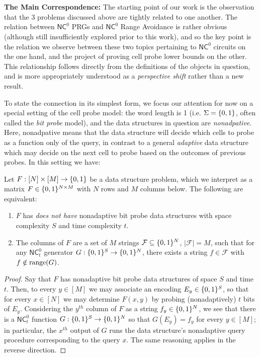 ~\\~\\
{\bf \noindent The Main Correspondence:}
The starting point of our work is the observation that the 3 problems discussed above are tightly related to one another. The relation between $\mathsf{NC}^0$ PRGs and $\mathsf{NC}^0$ Range Avoidance is rather obvious (although still insufficiently explored prior to this work), and so the key point is the relation we observe between these two topics pertaining to $\mathsf{NC}^0$ circuits on the one hand, and the project of proving cell probe lower bounds on the other. This relationship follows directly from the definitions of the objects in question, and is more appropriately understood as a \emph{perspective shift} rather than a new result. 

To state the connection in its simplest form, we focus our attention for now on a special setting of the cell probe model: the word length is 1 (i.e. $\Sigma = \{0,1\}$, often called the \emph{bit probe} model), and the data structures in question are \emph{nonadpative}. Here, nonadpative means that the data structure will decide which cells to probe as a function only of the query, in contrast to a general \emph{adaptive} data structure which may decide on the next cell to probe based on the outcomes of previous probes. In this setting we have:
\begin{observation*}
Let $F: [N] \times [M] \to \{0,1\}$ be a data structure problem, which we interpret as a matrix $F \in \{0,1\}^{N \times M}$ with $N$ rows and $M$ columns below. The following are equivalent:
\begin{enumerate}
    \item $F$ has \emph{does not have} nonadaptive bit probe data structures with space complexity $S$ and time complexity $t$.
    \item The columns of $F$ are a set of $M$ strings $\mathcal{F} \subseteq \{0,1\}^N$, $|\mathcal{F}|=M$, such that for any $\mathsf{NC}^0_t$ generator $G: \{0,1\}^S \to \{0,1\}^N$, there exists a string $f \in \mathcal{F}$ with $f \notin \mathrm{range}(G)$.
\end{enumerate}
\end{observation*}
\begin{proof}
Say that $F$ has nonadaptive bit probe data structures of space $S$ and time $t$. Then, to every $y \in [M]$ we may associate an encoding $E_y \in \{0,1\}^S$, so that for every $x \in [N]$ we may determine $F(x,y)$ by probing (nonadaptively) $t$ bits of $E_y$. Considering the $y^{th}$ column of $F$ as a string $f_y\in \{0,1\}^N$, we see that there is a $\mathsf{NC}^0_t$ function $G: \{0,1\}^S \to \{0,1\}^N$ so that $G(E_y) = f_y$ for every $y\in [M]$; in particular, the $x^{th}$ output of $G$ runs the data structure's nonadaptive query procedure corresponding to the query $x$. The same reasoning applies in the reverse direction.
\end{proof}

